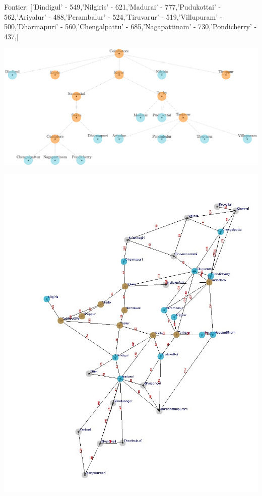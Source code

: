 \documentclass[xcolor=table]{beamer}
\begin{document}
\begin{frame}
  { \tiny Fontier: ['Dindigul' - 549,'Nilgiris' - 621,'Madurai' - 777,'Pudukottai' - 562,'Ariyalur' - 488,'Perambalur' - 524,'Tiruvarur' - 519,'Villupuram' - 500,'Dharmapuri' - 560,'Chengalpattu' - 685,'Nagapattinam' - 730,'Pondicherry' - 437,]}
  \begin{center}
  \includegraphics[height=0.35\textheight]{../AStarNode/11-1.png}
  \end{center}
  \begin{center}
    \includegraphics[height=0.55\textheight]{../AStaroutput/tamilAStar9.jpg}
  \end{center}
\end{frame}
\end{document}
